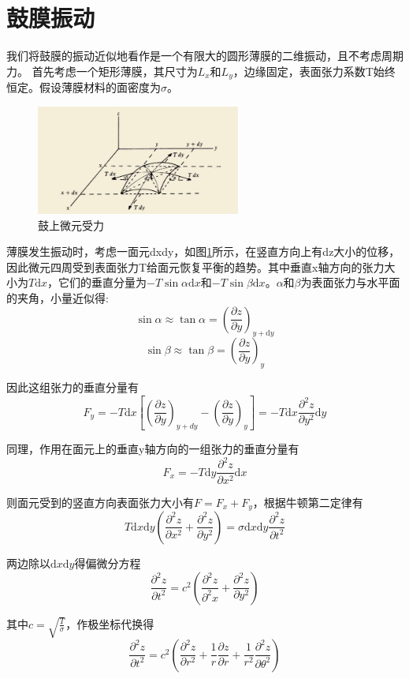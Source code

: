 \section{鼓膜振动}
我们将鼓膜的振动近似地看作是一个有限大的圆形薄膜的二维振动，且不考虑周期力。
首先考虑一个矩形薄膜，其尺寸为$L_x$和$L_y$，边缘固定，表面张力系数T始终恒定。假设薄膜材料的面密度为$\sigma$。
\begin{figure}[h]
	\centering %
	\includegraphics[width=0.6\textwidth]{pic/pic1} %
	\caption{鼓上微元受力} %
	\label{fig.1}	%
\end{figure}
薄膜发生振动时，考虑一面元dxdy，如图\ref{fig.1}所示，在竖直方向上有dz大小的位移，因此微元四周受到表面张力T给面元恢复平衡的趋势。其中垂直x轴方向的张力大小为$T\text{d}x$，它们的垂直分量为$-T\sin\alpha\text{d}x$和$-T\sin\beta\text{d}x$。$\alpha$和$\beta$为表面张力与水平面的夹角，小量近似得:
$$\sin\alpha\approx\tan\alpha=(\frac{\partial z}{\partial y})_{y+\text{d}y}$$
$$\sin\beta\approx\tan\beta=(\frac{\partial z}{\partial y})_y$$

因此这组张力的垂直分量有
$$F_y=-T\text{d}x\left[\left(\frac{\partial z}{\partial y}\right)_{y+d y}-\left(\frac{\partial z}{\partial y}\right)_y\right]=-T\text{d}x\frac{\partial^2 z}{\partial y^2}\text{d}y$$

同理，作用在面元上的垂直y轴方向的一组张力的垂直分量有
$$F_x=-T\text{d}y\frac{\partial^2 z}{\partial x^2}\text{d}x$$

则面元受到的竖直方向表面张力大小有$F=F_x+F_y$，根据牛顿第二定律有
$$T \text{d} x \text{d} y\left(\frac{\partial^2 z}{\partial x^2}+\frac{\partial^2 z}{\partial y^2}\right)=\sigma \text{d} x \text{d} y \frac{\partial^2 z}{\partial t^2}$$

两边除以$\text{d}x\text{d}y$得偏微分方程
$$\frac{\partial^2 z}{\partial t^2}=c^2\left(\frac{\partial^2 z}{\partial^2 x}+\frac{\partial^2 z}{\partial y^2}\right)$$

其中$c=\sqrt{\frac{T}{\sigma}}$，作极坐标代换得
$$\frac{\partial^2 z}{\partial t^2}=c^2\left(\frac{\partial^2 z}{\partial r^2}+\frac{1}{r} \frac{\partial z}{\partial r}+\frac{1}{r^2} \frac{\partial^2 z}{\partial \theta^2}\right)$$


